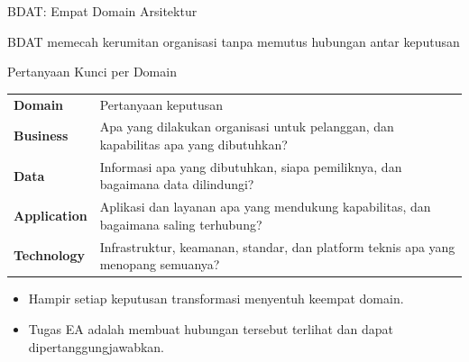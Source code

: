 \documentclass[aspectratio=169, table]{beamer}
\newcommand{\takeaway}[1]{%
  \vspace{4pt}
  {\footnotesize #1}
}
\begin{document}
\begin{frame}{BDAT: Empat Domain Arsitektur}
  \vspace{0pt}
  \centering

  \takeaway{BDAT memecah kerumitan organisasi tanpa memutus hubungan antar keputusan}
\end{frame}

\begin{frame}{Pertanyaan Kunci per Domain}
  \vspace{10pt}
  \renewcommand{\arraystretch}{1.25}
  \footnotesize
  \begin{tabularx}{\textwidth}{>{\bfseries}p{}X}
    \rowcolor{praditagreen!18}
    Domain & Pertanyaan keputusan \\
    Business & Apa yang dilakukan organisasi untuk pelanggan, dan kapabilitas apa yang dibutuhkan? \\
    Data & Informasi apa yang dibutuhkan, siapa pemiliknya, dan bagaimana data dilindungi? \\
    Application & Aplikasi dan layanan apa yang mendukung kapabilitas, dan bagaimana saling terhubung? \\
    Technology & Infrastruktur, keamanan, standar, dan platform teknis apa yang menopang semuanya? \\
  \end{tabularx}

  \vspace{12pt}
  \begin{itemize}
    \item Hampir setiap keputusan transformasi menyentuh keempat domain.
    \item Tugas EA adalah membuat hubungan tersebut terlihat dan dapat dipertanggungjawabkan.
  \end{itemize}
\end{frame}
\end{document}
